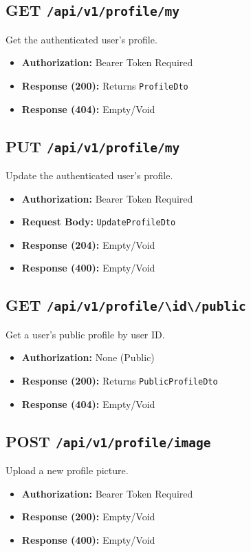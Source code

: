 \subsection{GET \texttt{/api/v1/profile/my}}
Get the authenticated user's profile.
\begin{itemize}
    \item \textbf{Authorization:} Bearer Token Required
    \item \textbf{Response (200):} Returns \texttt{ProfileDto}
    \item \textbf{Response (404):} Empty/Void
\end{itemize}

\subsection{PUT \texttt{/api/v1/profile/my}}
Update the authenticated user's profile.
\begin{itemize}
    \item \textbf{Authorization:} Bearer Token Required
    \item \textbf{Request Body:} \texttt{UpdateProfileDto}
    \item \textbf{Response (204):} Empty/Void
    \item \textbf{Response (400):} Empty/Void
\end{itemize}

\subsection{GET \texttt{/api/v1/profile/\textbackslash{}{id\textbackslash{}}/public}}
Get a user's public profile by user ID.
\begin{itemize}
    \item \textbf{Authorization:} None (Public)
    \item \textbf{Response (200):} Returns \texttt{PublicProfileDto}
    \item \textbf{Response (404):} Empty/Void
\end{itemize}

\subsection{POST \texttt{/api/v1/profile/image}}
Upload a new profile picture.
\begin{itemize}
    \item \textbf{Authorization:} Bearer Token Required
    \item \textbf{Response (200):} Empty/Void
    \item \textbf{Response (400):} Empty/Void
\end{itemize}

